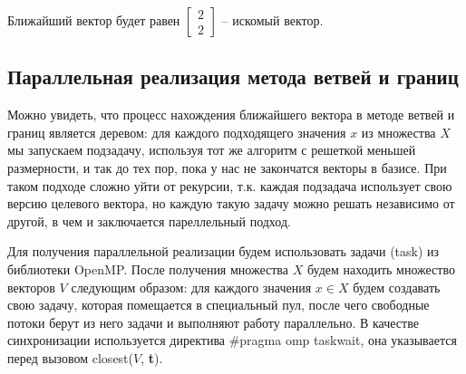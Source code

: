 Ближайший вектор будет равен $ \left[\begin{array}{cccc}
2 \\
2
\end{array}\right] $ -- искомый вектор.

\subsection{Параллельная реализация метода ветвей и границ}

Можно увидеть, что процесс нахождения ближайшего вектора в методе ветвей и границ является деревом: для каждого подходящего значения $ x $ из множества $ X $ мы запускаем подзадачу, используя тот же алгоритм с решеткой меньшей размерности, и так до тех пор, пока у нас не закончатся векторы в базисе. При таком подходе сложно уйти от рекурсии, т.к. каждая подзадача использует свою версию целевого вектора, но каждую такую задачу можно решать независимо от другой, в чем и заключается пареллельный подход.

Для получения параллельной реализации будем использовать задачи (task) из библиотеки OpenMP. После получения множества $ X $ будем находить множество векторов $ V $ следующим образом: для каждого значения $ x \in X $ будем создавать свою задачу, которая помещается в специальный пул, после чего свободные потоки берут из него задачи и выполняют работу параллельно. В качестве синхронизации используется директива \#pragma omp taskwait, она указывается перед вызовом closest($V$, \textbf{t}).

\clearpage